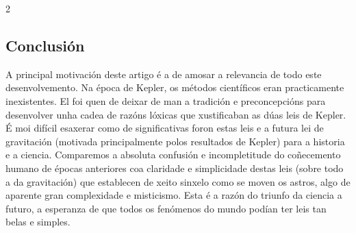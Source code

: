 \begin{multicols}{2}
\subsection*{Conclusión}

A principal motivación deste artigo é a de amosar a relevancia de todo este
desenvolvemento. Na época de Kepler, os métodos científicos eran practicamente
inexistentes. El foi quen de deixar de man a tradición e preconcepcións para
desenvolver unha cadea de razóns lóxicas que xustificaban as dúas leis
de Kepler. É moi difícil esaxerar como de significativas foron estas leis e a
futura lei de gravitación (motivada principalmente polos resultados de Kepler)
para a historia e a ciencia. Comparemos a absoluta confusión e incompletitude
do coñecemento humano de épocas anteriores coa claridade e simplicidade destas
leis (sobre todo a da gravitación) que establecen de xeito sinxelo como se
moven os astros, algo de aparente gran complexidade e misticismo. Esta é a
razón do triunfo da ciencia a futuro, a esperanza de que todos os fenómenos do
mundo podían ter leis tan belas e simples.

\nocite{bizarre_mars}
\nocite{kepler_disc}
\nocite{shoulders}
\nocite{koestler_2017}
\nocite{kepler_2015}

\printbibliography

\end{multicols}
